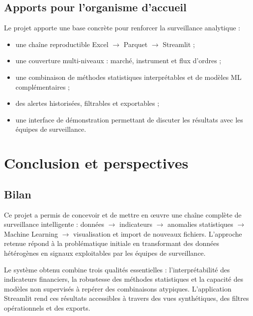 \documentclass[a4paper,12pt,twoside,openright]{report}
\begin{document}
\section{Apports pour l'organisme d'accueil}
Le projet apporte une base concrète pour renforcer la surveillance analytique :
\begin{itemize}
  \item une chaîne reproductible Excel $\rightarrow$ Parquet $\rightarrow$ Streamlit ;
  \item une couverture multi-niveaux : marché, instrument et flux d'ordres ;
  \item une combinaison de méthodes statistiques interprétables et de modèles ML complémentaires ;
  \item des alertes historisées, filtrables et exportables ;
  \item une interface de démonstration permettant de discuter les résultats avec les équipes de surveillance.
\end{itemize}

\chapter{Conclusion et perspectives}
\label{chap:concl}

\section{Bilan}
Ce projet a permis de concevoir et de mettre en œuvre une chaîne complète de surveillance intelligente : données $\rightarrow$ indicateurs $\rightarrow$ anomalies statistiques $\rightarrow$ Machine Learning $\rightarrow$ visualisation et import de nouveaux fichiers. L'approche retenue répond à la problématique initiale en transformant des données hétérogènes en signaux exploitables par les équipes de surveillance.

Le système obtenu combine trois qualités essentielles : l'interprétabilité des indicateurs financiers, la robustesse des méthodes statistiques et la capacité des modèles non supervisés à repérer des combinaisons atypiques. L'application Streamlit rend ces résultats accessibles à travers des vues synthétiques, des filtres opérationnels et des exports.
\end{document}
